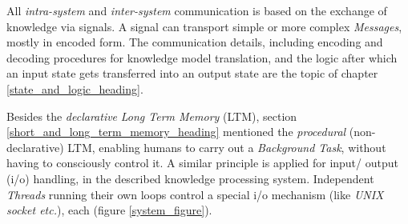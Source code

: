 All \emph{intra-system} and \emph{inter-system} communication is based on the
exchange of knowledge via signals. A signal can transport simple or more complex
\emph{Messages}, mostly in encoded form. The communication details, including
encoding and decoding procedures for knowledge model translation, and the logic
after which an input state gets transferred into an output state are the topic
of chapter \ref{state_and_logic_heading}.

Besides the \emph{declarative} \emph{Long Term Memory} (LTM), section
\ref{short_and_long_term_memory_heading} mentioned the \emph{procedural}
(non-declarative) LTM, enabling humans to carry out a \emph{Background Task},
without having to consciously control it. A similar principle is applied for
input/ output (i/o) handling, in the described knowledge processing system.
Independent \emph{Threads} running their own loops control a special i/o
mechanism (like \emph{UNIX socket etc.}), each (figure \ref{system_figure}).
